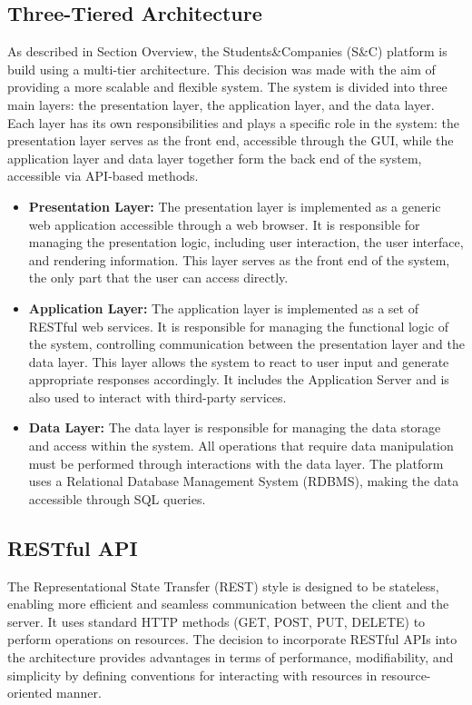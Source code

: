 \subsection{Three-Tiered Architecture}\label{subsec:three-tiered architecture}
As described in Section Overview, the Students\&Companies (S\&C) platform is build using a multi-tier architecture. This decision was made with the aim of 
providing a more scalable and flexible system.
The system is divided into three main layers: the presentation layer, the application layer, and the data layer.
Each layer has its own responsibilities and plays a specific role in the system: the presentation layer serves as the front end, accessible through the GUI, 
while the application layer and data layer together form the back end of the system, accessible via API-based methods.
\begin{itemize}
    \item \textbf{Presentation Layer:} The presentation layer is implemented as a generic web application accessible through a web browser.
    It is responsible for managing the presentation logic, including user interaction, the user interface, and rendering information.
    This layer serves as the front end of the system, the only part that the user can access directly.
    \item \textbf{Application Layer:} The application layer is implemented as a set of RESTful web services.
    It is responsible for managing the functional logic of the system, controlling communication between the presentation layer and the data layer.
    This layer allows the system to react to user input and generate appropriate responses accordingly.
    It includes the Application Server and is also used to interact with third-party services.
    \item \textbf{Data Layer:} The data layer is responsible for managing the data storage and access within the system.
    All operations that require data manipulation must be performed through interactions with the data layer.
    The platform uses a Relational Database Management System (RDBMS), making the data accessible through SQL queries.
\end{itemize}
\subsection{RESTful API}\label{subsec:restful api}
The Representational State Transfer (REST) style is designed to be stateless, enabling more efficient and seamless communication between the client and the server.
It uses standard HTTP methods (GET, POST, PUT, DELETE) to perform operations on resources.
The decision to incorporate RESTful APIs into the architecture provides advantages in terms of performance, modifiability, and simplicity by defining conventions 
for interacting with resources in resource-oriented manner.
